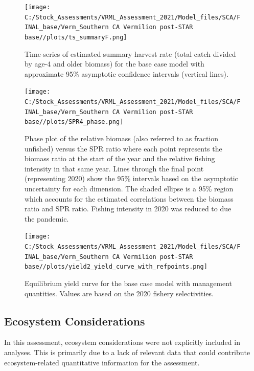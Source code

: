 \documentclass[11pt,
  english,
]{article}
\begin{document}
\begin{figure}
\centering
\texttt{[image: C:/Stock\_Assessments/VRML\_Assessment\_2021/Model\_files/SCA/FINAL\_base/Verm\_Southern CA Vermilion post-STAR base//plots/ts\_summaryF.png]}
\caption{Time-series of estimated summary harvest rate (total catch divided by age-4 and older biomass) for the base case model with approximate 95\% asymptotic confidence intervals (vertical lines).\label{fig:FmortalityES}}
\end{figure}

\begin{figure}
\centering
\texttt{[image: C:/Stock\_Assessments/VRML\_Assessment\_2021/Model\_files/SCA/FINAL\_base/Verm\_Southern CA Vermilion post-STAR base//plots/SPR4\_phase.png]}
\caption{Phase plot of the relative biomass (also referred to as fraction unfished) versus the SPR ratio where each point represents the biomass ratio at the start of the year and the relative fishing intensity in that same year. Lines through the final point (representing 2020) show the 95\% intervals based on the asymptotic uncertainty for each dimension. The shaded ellipse is a 95\% region which accounts for the estimated correlations between the biomass ratio and SPR ratio. Fishing intensity in 2020 was reduced to due the pandemic.\label{fig:phaseES}}
\end{figure}

\begin{figure}
\centering
\texttt{[image: C:/Stock\_Assessments/VRML\_Assessment\_2021/Model\_files/SCA/FINAL\_base/Verm\_Southern CA Vermilion post-STAR base//plots/yield2\_yield\_curve\_with\_refpoints.png]}
\caption{Equilibrium yield curve for the base case model with management quantities. Values are based on the 2020 fishery selectivities.\label{fig:yield2ES}}
\end{figure}

\FloatBarrier


\hypertarget{ecosystem-considerations}{%
\subsection*{Ecosystem Considerations}\label{ecosystem-considerations}}

\leavevmode\tagmcend\tagstructend

In this assessment, ecosystem considerations were not explicitly included in analyses. This is primarily due to a lack of relevant data that could contribute ecosystem-related quantitative information for the assessment.
\end{document}
